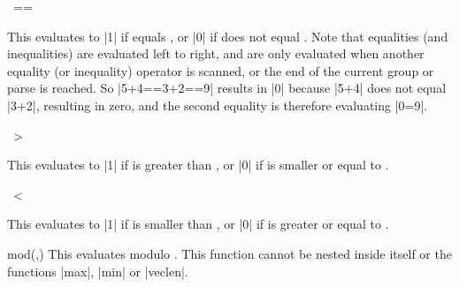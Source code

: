 \begin{math-operator}{\ ==\ } 

	This evaluates to |1| if  equals , or |0| if 
	does not equal . 
	Note that equalities (and inequalities) are evaluated left to right, 
	and are only evaluated when another equality (or inequality) operator 
	is scanned, or the end of the current group or parse is reached. So 
	|5+4==3+2==9| results in |0| because |5+4| does not equal |3+2|, 
	resulting in zero, and the second equality is therefore evaluating 
	|0=9|.

\begin{codeexample}[post=\tt\footnotesize\pgfmathresult]
\end{codeexample}

\end{math-operator}


\begin{math-operator}{\ >\ } 

	This evaluates to |1| if  is greater than , or |0| if 
	 is smaller or equal to .
	
\begin{codeexample}[post=\tt\footnotesize\pgfmathresult]
\end{codeexample}

\end{math-operator}

\begin{math-operator}{\ <\ }

	This evaluates to |1| if  is smaller than , or |0| if
	 is greater or equal to .
	
\begin{codeexample}[post=\tt\footnotesize\pgfmathresult]
\end{codeexample}

\end{math-operator}

\begin{math-function}{mod(,)}
	This evaluates  modulo . This function cannot be 
	nested inside itself or the functions |max|, |min| or |veclen|.

\begin{codeexample}[post=\tt\footnotesize\pgfmathresult]
\end{codeexample}

\end{math-function}

